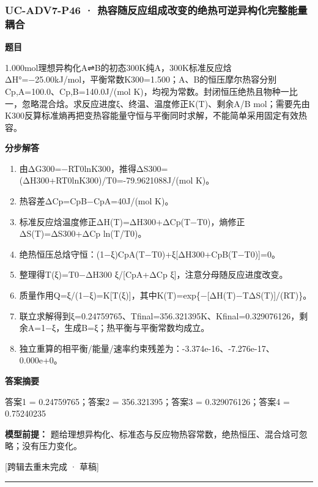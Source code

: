 \documentclass[UTF8,11pt,a4paper]{ctexart}
\begin{document}
\subsubsection*{UC-ADV7-P46 · 热容随反应组成改变的绝热可逆异构化完整能量耦合}
\noindent\textbf{题目}\par
1.000mol理想异构化A⇌B的初态300K纯A，300K标准反应焓ΔH°=−25.00kJ/mol，平衡常数K300=1.500；A、B的恒压摩尔热容分别Cp,A=100.0、Cp,B=140.0J/(mol K)，均视为常数。封闭恒压绝热且物种一比一，忽略混合焓。求反应进度ξ、终温、温度修正K(T)、剩余A/B mol；需要先由K300反算标准熵再把变热容能量守恒与平衡同时求解，不能简单采用固定有效热容。\par
\medskip\noindent\textbf{分步解答}
\begin{enumerate}
\item 由ΔG300=−RT0lnK300，推得ΔS300=(ΔH300+RT0lnK300)/T0=-79.9621088J/(mol K)。
\item 热容差ΔCp=CpB−CpA=40J/(mol K)。
\item 标准反应焓温度修正ΔH(T)=ΔH300+ΔCp(T−T0)，熵修正ΔS(T)=ΔS300+ΔCp ln(T/T0)。
\item 绝热恒压总焓守恒：(1−ξ)CpA(T−T0)+ξ[ΔH300+CpB(T−T0)]=0。
\item 整理得T(ξ)=T0−ΔH300 ξ/[CpA+ΔCp ξ]，注意分母随反应进度改变。
\item 质量作用Q=ξ/(1−ξ)=K[T(ξ)]，其中K(T)=exp\{−[ΔH(T)−TΔS(T)]/(RT)\}。
\item 联立求解得到ξ=0.24759765、Tfinal=356.321395K、Kfinal=0.329076126，剩余A=1−ξ，生成B=ξ；热平衡与平衡常数均成立。
\item 独立重算的相平衡/能量/速率约束残差为：-3.374e-16、-7.276e-17、0.000e+0。
\end{enumerate}
\noindent\textbf{答案摘要}\par
答案1 = 0.24759765；答案2 = 356.321395；答案3 = 0.329076126；答案4 = 0.75240235\par
\noindent\textbf{模型前提：}
题给理想异构化、标准态与反应物热容常数，绝热恒压、混合焓可忽略；没有压力变化。\par
\noindent\textcolor{red!65!black}{[跨辑去重未完成 · 草稿]} \par
\medskip\hrule\medskip
{}
\end{document}
